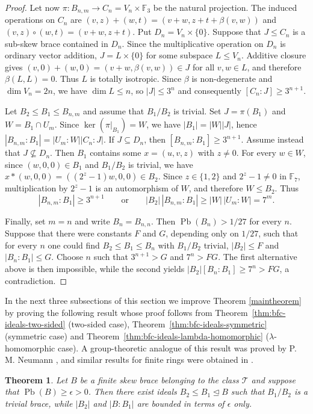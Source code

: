 \documentclass[10pt,a4paper]{amsart}
\numberwithin{equation}{section}
\newtheorem{thm}[equation]{Theorem}
\newcommand{\Pb}{\operatorname{Pb} }
\begin{document}
\begin{proof}
Let now $\pi:B_{n,m}\to C_n=V_n\times\mathbb F_3$ be the natural projection. The induced operations on $C_n$ are
$(v,z)+(w,t)=(v+w,z+t+\beta(v,w))$ and
$(v,z)\circ(w,t)=(v+w,z+t)$. Put $D_n=V_n\times\{0\}$. Suppose that $J\leqslant C_n$ is a sub-skew brace contained in $D_n$. Since the multiplicative operation on $D_n$ is ordinary vector addition, $J=L\times\{0\}$ for some subspace $L\leqslant V_n$. Additive closure gives
$(v,0)+(w,0)=(v+w,\beta(v,w))\in J$ for all $v,w\in L$, and therefore $\beta(L,L)=0$. Thus $L$ is totally isotropic. Since $\beta$ is non-degenerate and $\dim V_n=2n$, we have $\dim L\leqslant n$, so $|J|\leqslant3^n$ and consequently $[C_n:J]\geqslant3^{n+1}$.

Let $B_2\leqslant B_1\leqslant B_{n,m}$ and assume that $B_1/B_2$ is trivial. Set $J=\pi(B_1)$ and $W=B_1\cap U_m$. Since $\ker(\pi|_{B_1})=W$, we have $|B_1|=|W||J|$, hence
$|B_{n,m}:B_1|=|U_m:W||C_n:J|$. If $J\subseteq D_n$, then $[B_{n,m}:B_1]\geqslant3^{n+1}$. Assume instead that $J\not\subseteq D_n$. Then $B_1$ contains some $x=(u,v,z)$ with $z\neq0$. For every $w\in W$, since $(w,0,0)\in B_1$ and $B_1/B_2$ is trivial, we have
$x*(w,0,0)=((2^z-1)w,0,0)\in B_2$. Since $z\in\{1,2\}$ and $2^z-1\neq0$ in $\mathbb F_7$, multiplication by $2^z-1$ is an automorphism of $W$, and therefore $W\leqslant B_2$. Thus
$$
|B_{n,m}:B_1|\geqslant3^{n+1}
\qquad\text{or}\qquad
|B_2|\,|B_{n,m}:B_1|
\geqslant |W|\,|U_m:W|
=7^m.
$$

Finally, set $m=n$ and write $B_n=B_{n,n}$. Then $\Pb(B_n)>1/27$ for every $n$. Suppose that there were constants $F$ and $G$, depending only on $1/27$, such that for every $n$ one could find $B_2\leqslant B_1\leqslant B_n$ with $B_1/B_2$ trivial, $|B_2|\leqslant F$ and $|B_n:B_1|\leqslant G$. Choose $n$ such that $3^{n+1}>G$ and $7^n>FG$. The first alternative above is then impossible, while the second yields
$|B_2|[B_n:B_1]\geqslant7^n>FG$, a contradiction.
\end{proof}


In the next three subsections of this section we improve Theorem \ref{maintheorem} by proving the following result whose proof follows from   Theorem~\ref{thm:bfc-ideals-two-sided} (two-sided case),  Theorem~\ref{thm:bfc-ideals-symmetric} (symmetric case) and  Theorem~\ref{thm:bfc-ideals-lambda-homomorphic} ($\lambda$-homomorphic case). A group-theoretic analogue of this result was proved by P. M. Neumann \cite{PMN89}, and similar results for finite rings were obtained in  \cite{SV24}. 

\begin{thm}\label{thm:bfc-ideals-class-T}
Let $B$ be a finite skew brace belonging to the class $\mathcal T$ and suppose that $\Pb(B)\geqslant\epsilon>0$. Then there exist ideals $B_2 \leqslant B_1\trianglelefteq B$ such that $B_1/B_2$ is a trivial brace, while $|B_2|$ and $|B:B_1|$ are bounded in terms of $\epsilon$ only.
\end{thm}
\end{document}
